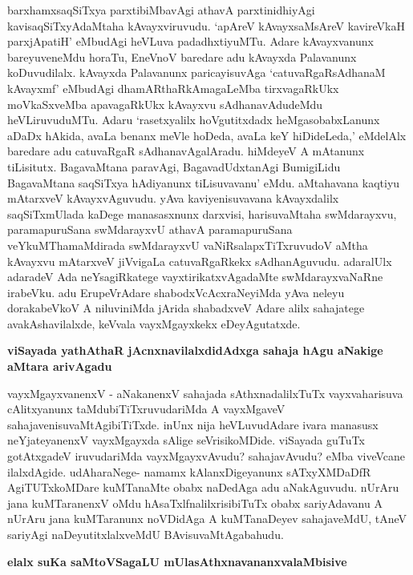 barxhamxsaqSiTxya parxtibiMbavAgi athavA parxtinidhiyAgi kavisaqSiTxyAdaMtaha kAvayxviruvudu. `apAreV kAvayxsaMsAreV kavireVkaH parxjApatiH'\label{page193} eMbudAgi heVLuva padadhxtiyuMTu. Adare kAvayxvanunx bareyuveneMdu horaTu, EneVnoV baredare adu kAvayxda Palavanunx koDuvudilalx. kAvayxda Palavanunx paricayisuvAga `catuvaRgaRsAdhanaM kAvayxmf'\label{193} eMbudAgi dhamARthaRkAmagaLeMba tirxvagaRkUkx moVkaSxveMba apavagaRkUkx kAvayxvu sAdhanavAdudeMdu heVLiruvuduMTu. Adaru `rasetxyalilx hoVgutitxdadx heMgasobabxLanunx aDaDx hAkida, avaLa benanx meVle hoDeda, avaLa keY hiDideLeda,' eMdelAlx baredare adu catuvaRgaR sAdhanavAgalAradu. hiMdeyeV A mAtanunx tiLisitutx. BagavaMtana paravAgi, BagavadUdxtanAgi BumigiLidu BagavaMtana saqSiTxya hAdiyanunx tiLisuvavanu' eMdu. aMtahavana kaqtiyu mAtarxveV kAvayxvAguvudu. yAva kaviyenisuvavana kAvayxdalilx saqSiTxmUlada kaDege manasasxnunx darxvisi, harisuvaMtaha swMdarayxvu, paramapuruSana swMdarayxvU athavA paramapuruSana veYkuMThamaMdirada swMdarayxvU vaNiRsalapxTiTxruvudoV aMtha kAvayxvu mAtarxveV jiVvigaLa catuvaRgaRkekx sAdhanAguvudu. adaralUlx adaradeV Ada neYsagiRkatege vayxtirikatxvAgadaMte swMdarayxvaNaRne irabeVku. adu ErupeVrAdare shabodxVcAcxraNeyiMda yAva neleyu dorakabeVkoV A niluviniMda jArida shabadxveV Adare alilx sahajatege avakAshavilalxde, keVvala vayxMgayxkekx eDeyAgutatxde.

\noindent
{\bf\large{viSayada yathAthaR jAcnxnavilalxdidAdxga sahaja hAgu aNakige aMtara arivAgadu}}\label{page194}

vayxMgayxvanenxV - aNakanenxV sahajada sAthxnadalilxTuTx vayxvaharisuva cAlitxyanunx taMdubiTiTxruvudariMda A vayxMgaveV sahajavenisuvaMtAgibiTiTxde. inUnx nija heVLuvudAdare ivara manasusx neYjateyanenxV vayxMgayxda sAlige seVrisikoMDide. viSayada guTuTx gotAtxgadeV iruvudariMda vayxMgayxvAvudu? sahajavAvudu? eMba viveVcane ilalxdAgide. udAharaNege- namamx kAlanxDigeyanunx sATxyXMDaDfR AgiTUTxkoMDare kuMTanaMte obabx naDedAga adu aNakAguvudu. nUrAru jana kuMTaranenxV oMdu hAsaTxlfnalilxrisibiTuTx obabx sariyAdavanu A nUrAru jana kuMTaranunx noVDidAga A kuMTanaDeyev sahajaveMdU, tAneV sariyAgi naDeyutitxlalxveMdU BAvisuvaMtAgabahudu.

\noindent
{\bf\large{elalx suKa saMtoVSagaLU mUlasAthxnavananxvalaMbisive}}\label{page194}

